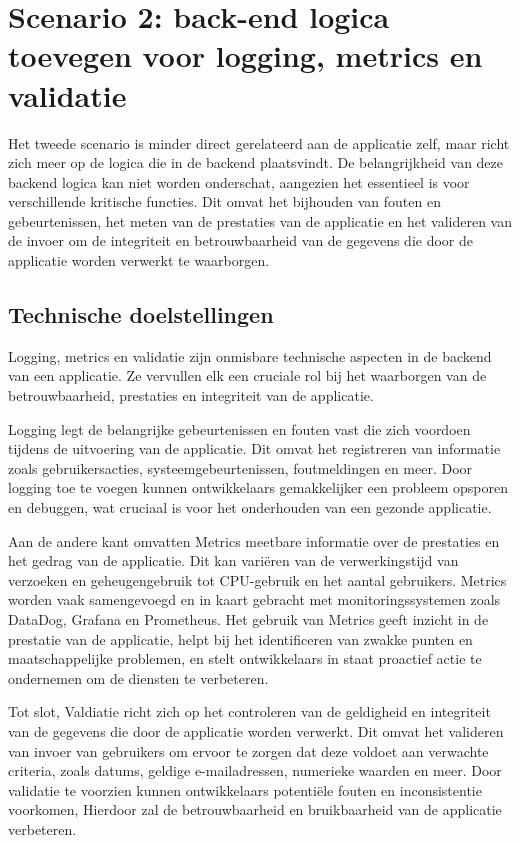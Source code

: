 \section{Scenario 2: back-end logica toevegen voor logging, metrics en validatie}

Het tweede scenario is minder direct gerelateerd aan de applicatie zelf, maar richt zich meer op de logica die in de backend plaatsvindt. De belangrijkheid van deze backend logica kan niet worden onderschat, aangezien het essentieel is voor verschillende kritische functies. Dit omvat het bijhouden van fouten en gebeurtenissen, het meten van de prestaties van de applicatie en het valideren van de invoer om de integriteit en betrouwbaarheid van de gegevens die door de applicatie worden verwerkt te waarborgen.

\subsection{Technische doelstellingen}

Logging, metrics en validatie zijn onmisbare technische aspecten in de backend van een applicatie. Ze vervullen elk een cruciale rol bij het waarborgen van de betrouwbaarheid, prestaties en integriteit van de applicatie.

Logging legt de belangrijke gebeurtenissen en fouten vast die zich voordoen tijdens de uitvoering van de applicatie. Dit omvat het registreren van informatie zoals gebruikersacties, systeemgebeurtenissen, foutmeldingen en meer. Door logging toe te voegen kunnen ontwikkelaars gemakkelijker een probleem opsporen en debuggen, wat cruciaal is voor het onderhouden van een gezonde applicatie. 

Aan de andere kant omvatten Metrics meetbare informatie over de prestaties en het gedrag van de applicatie. Dit kan variëren van de verwerkingstijd van verzoeken en geheugengebruik tot CPU-gebruik en het aantal gebruikers. Metrics worden vaak samengevoegd en in kaart gebracht met monitoringssystemen zoals DataDog, Grafana en Prometheus. Het gebruik van Metrics geeft inzicht in de prestatie van de applicatie, helpt bij het identificeren van zwakke punten en maatschappelijke problemen, en stelt ontwikkelaars in staat proactief actie te ondernemen om de diensten te verbeteren. 

Tot slot, Valdiatie richt zich op het controleren van de geldigheid en integriteit van de gegevens die door de applicatie worden verwerkt. Dit omvat het valideren van invoer van gebruikers om ervoor te zorgen dat deze voldoet aan verwachte criteria, zoals datums, geldige e-mailadressen, numerieke waarden en meer. Door validatie te voorzien kunnen ontwikkelaars potentiële fouten en inconsistentie voorkomen, Hierdoor zal de betrouwbaarheid en bruikbaarheid van de applicatie verbeteren.

